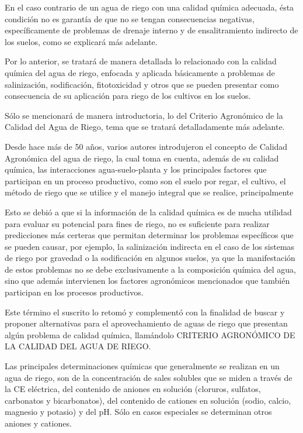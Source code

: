 En el caso contrario de un agua de riego con una calidad química adecuada, ésta condición no es garantía de que no se tengan consecuencias negativas, específicamente de problemas de drenaje interno y de ensalitramiento indirecto de los suelos, como se explicará más adelante.

Por lo anterior, se tratará de manera detallada lo relacionado con la calidad química del agua de riego, enfocada y aplicada básicamente a problemas de salinización, sodificación, fitotoxicidad y otros que se pueden presentar como consecuencia de su aplicación para riego de los cultivos en los suelos.

Sólo se mencionará de manera introductoria, lo del Criterio Agronómico de la Calidad del Agua de Riego, tema que se tratará detalladamente más adelante.

Desde hace más de 50 años, varios autores introdujeron el concepto de Calidad Agronómica del agua de riego, la cual toma en cuenta, además de su calidad química, las interacciones agua-suelo-planta y los principales factores que participan en un proceso productivo, como son el suelo por regar, el cultivo, el método de riego que se utilice y el manejo integral que se realice, principalmente

Esto se debió a que si la información de la calidad química es de mucha utilidad para evaluar su potencial para fines de riego, no es suficiente para realizar predicciones más certeras que permitan determinar los problemas específicos que se pueden causar, por ejemplo, la salinización indirecta en el caso de los sistemas de riego por gravedad o la sodificación en algunos suelos, ya que la manifestación de estos problemas no se debe exclusivamente a la composición química del agua, sino que además intervienen los factores agronómicos mencionados que también participan en los procesos productivos.

Este término el suscrito lo retomó y complementó con la finalidad de buscar y proponer alternativas para el aprovechamiento de aguas de riego que presentan algún problema de calidad química, llamándolo CRITERIO AGRONÓMICO DE LA CALIDAD DEL AGUA DE RIEGO.

Las principales determinaciones químicas que generalmente se realizan en un agua de riego, son de la concentración de sales solubles que se miden a través de la CE eléctrica, del contenido de aniones en solución (cloruros, sulfatos, carbonatos y bicarbonatos), del contenido de cationes en solución (sodio, calcio, magnesio y potasio) y del pH. Sólo en casos especiales se determinan otros aniones y cationes.

